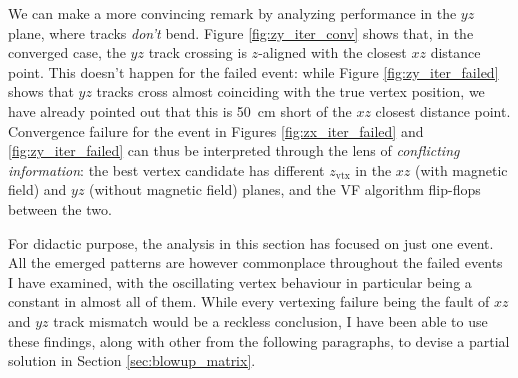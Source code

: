 We can make a more convincing remark by analyzing performance in the $yz$ plane, where tracks \textit{don't} bend.
Figure \ref{fig:zy_iter_conv} shows that, in the converged case, the $yz$ track crossing is $z$-aligned with the closest $xz$ distance point.
This doesn't happen for the failed event: while Figure \ref{fig:zy_iter_failed} shows that $yz$ tracks cross almost coinciding with the true vertex position, we have already pointed out that this is \SI{50}{cm} short of the $xz$ closest distance point.
Convergence failure for the event in Figures \ref{fig:zx_iter_failed} and \ref{fig:zy_iter_failed} can thus be interpreted through the lens of \textit{conflicting information}:
the best vertex candidate has different $z_\text{vtx}$ in the $xz$ (with magnetic field) and $yz$ (without magnetic field) planes, and the VF algorithm flip-flops between the two.

For didactic purpose, the analysis in this section has focused on just one event.
All the emerged patterns are however commonplace throughout the failed events I have examined, with the oscillating vertex behaviour in particular being a constant in almost all of them.
While every \lbz vertexing failure being the fault of $xz$ and $yz$ track mismatch would be a reckless conclusion, I have been able to use these findings, along with other from the following paragraphs, to devise a partial solution in Section \ref{sec:blowup_matrix}.


